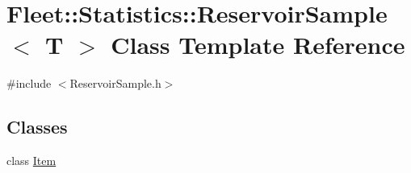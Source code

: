 \hypertarget{class_fleet_1_1_statistics_1_1_reservoir_sample}{}\section{Fleet\+:\+:Statistics\+:\+:Reservoir\+Sample$<$ T $>$ Class Template Reference}
\label{class_fleet_1_1_statistics_1_1_reservoir_sample}


{\ttfamily \#include $<$Reservoir\+Sample.\+h$>$}

\subsection*{Classes}
\begin{DoxyCompactItemize}
\item 
class \hyperlink{class_fleet_1_1_statistics_1_1_reservoir_sample_1_1_item}{Item}
\end{DoxyCompactItemize}
